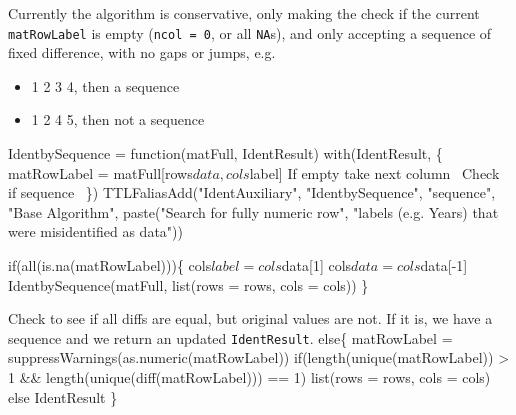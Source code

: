 \documentclass[a4paper]{article}
\begin{document}
Currently the algorithm is conservative, only making the check if the
current \verb|matRowLabel| is empty (\verb|ncol = 0|, or all
\verb|NA|s), and only accepting a sequence of fixed difference, with
no gaps or jumps, e.g.
\begin{itemize}
\item 1 2 3 4, then a sequence
\item 1 2 4 5, then not a sequence
\end{itemize}
\nwenddocs{}\endmoddef
IdentbySequence =
  function(matFull, IdentResult)
  with(IdentResult, \{
    matRowLabel = matFull[rows$data, cols$label]
    \LA{}If empty take next column~{\nwtagstyle{}}\RA{}
    \LA{}Check if sequence~{\nwtagstyle{}}\RA{}
  \})
TTLFaliasAdd("IdentAuxiliary", "IdentbySequence", "sequence",
             "Base Algorithm", paste("Search for fully numeric row",
             "labels (e.g. Years) that were misidentified as data"))
\nwendcode{}\nwdocspar

\nwenddocs{}\endmoddef
if(all(is.na(matRowLabel)))\{
  cols$label = cols$data[1]
  cols$data = cols$data[-1]
  IdentbySequence(matFull, list(rows = rows, cols = cols))
\}
\nwendcode{}\nwdocspar

Check to see if all diffs are equal, but original values are not. If
it is, we have a sequence and we return an updated \verb|IdentResult|.
\nwenddocs{}\endmoddef
else\{
  matRowLabel = suppressWarnings(as.numeric(matRowLabel))
  if(length(unique(matRowLabel)) > 1 &&
     length(unique(diff(matRowLabel))) == 1)
    list(rows = rows, cols = cols)
  else IdentResult
\}
\nwendcode{}\nwdocspar
\end{document}
